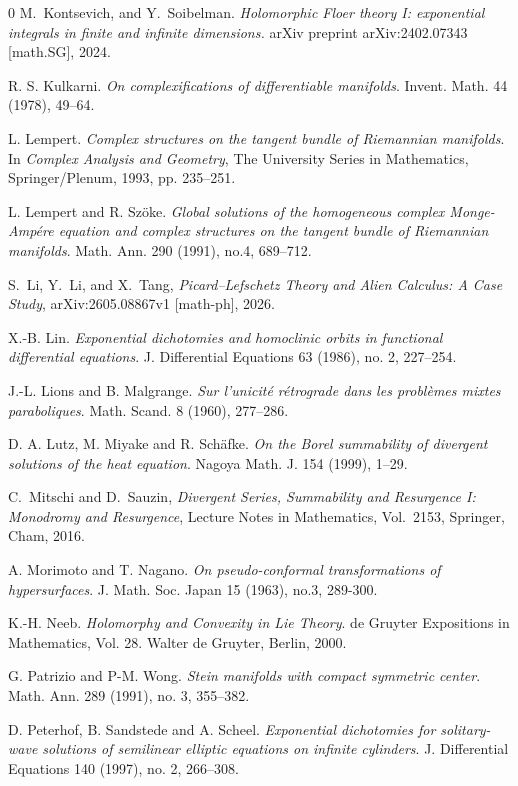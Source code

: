 \documentclass[11pt]{amsart}
\theoremstyle{plain}
\theoremstyle{definition}
\begin{document}
\begin{thebibliography}{0}
M.~Kontsevich, and Y.~Soibelman. \textit{Holomorphic Floer theory I: exponential integrals in finite and infinite dimensions.} arXiv preprint arXiv:2402.07343 [math.SG], 2024.


 R. S. Kulkarni.
\textit{On complexifications of differentiable manifolds}.
Invent. Math. 44 (1978), 49--64.


 L. Lempert.
\textit{Complex structures on the tangent bundle of Riemannian manifolds}.
In \textit{Complex Analysis and Geometry}, The University Series in Mathematics, Springer/Plenum, 1993, pp. 235--251.


 L. Lempert and R. Sz\"oke.
\textit{Global solutions of the homogeneous complex Monge-Amp\'ere equation and complex structures on the tangent bundle of Riemannian manifolds}.
Math. Ann. 290 (1991), no.4, 689--712.


S.~Li, Y.~Li, and X.~Tang,
\textit{Picard--Lefschetz Theory and Alien Calculus: A Case Study},
arXiv:2605.08867v1 [math-ph], 2026.


X.-B. Lin.
\textit{Exponential dichotomies and homoclinic orbits in functional differential equations}.
J. Differential Equations 63 (1986), no. 2, 227--254.


 J.-L. Lions and B. Malgrange.
\textit{Sur l'unicit{\'e} r{\'e}trograde dans les probl{\`e}mes mixtes paraboliques}.
Math. Scand. 8 (1960), 277--286.


 D. A. Lutz, M. Miyake and R. Sch\"afke.
\textit{On the Borel summability of divergent solutions of the heat equation}.
Nagoya Math. J. 154 (1999), 1--29.


C.~Mitschi and D.~Sauzin,
\textit{Divergent Series, Summability and Resurgence I:
Monodromy and Resurgence},
Lecture Notes in Mathematics, Vol.~2153, Springer, Cham, 2016.


 A. Morimoto and T. Nagano.
\textit{On pseudo-conformal transformations of hypersurfaces}.
J. Math. Soc. Japan 15 (1963), no.3, 289-300.


K.-H. Neeb.
\textit{Holomorphy and Convexity in Lie Theory}.
de Gruyter Expositions in Mathematics, Vol. 28. 
Walter de Gruyter, Berlin, 2000.

 G. Patrizio and P-M. Wong.
\textit{Stein manifolds with compact symmetric center}.
Math. Ann. 289 (1991), no. 3, 355--382.


D. Peterhof, B. Sandstede and A. Scheel.
\textit{Exponential dichotomies for solitary-wave solutions of semilinear elliptic equations on infinite cylinders}.
J. Differential Equations 140 (1997), no. 2, 266--308.



\end{thebibliography}
\end{document}
